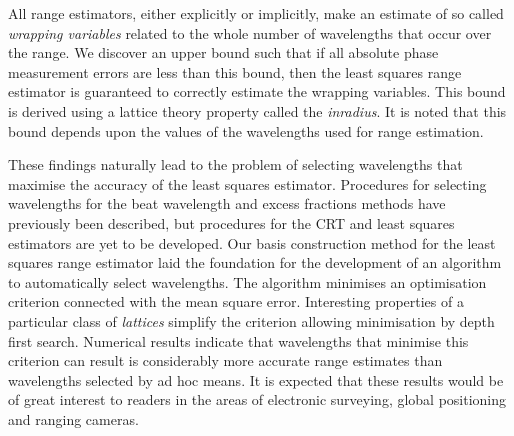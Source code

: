 All range estimators, either explicitly or implicitly, make an estimate of so called \emph{wrapping variables} related to the whole number of wavelengths that occur over the range. We discover an upper bound such that if all absolute phase measurement errors are less than this bound, then the least squares range estimator is guaranteed to correctly estimate the wrapping variables. This bound is derived using a lattice theory property called the \emph{inradius}. It is noted that this bound depends upon the values of the wavelengths used for range estimation.

These findings naturally lead to the problem of selecting wavelengths that maximise the accuracy of the least squares estimator. Procedures for selecting wavelengths for the beat wavelength and excess fractions methods have previously been described, but procedures for the CRT and least squares estimators are yet to be developed. Our basis construction method for the least squares range estimator laid the foundation for the development of an algorithm to automatically select wavelengths. The algorithm minimises an optimisation criterion connected with the mean square error. Interesting properties of a particular class of \emph{lattices} simplify the criterion allowing minimisation by depth first search. Numerical results indicate that wavelengths that minimise this criterion can result is considerably more accurate range estimates than wavelengths selected by ad hoc means. It is expected that these results would be of great interest to readers in the areas of electronic surveying, global positioning and ranging cameras.
